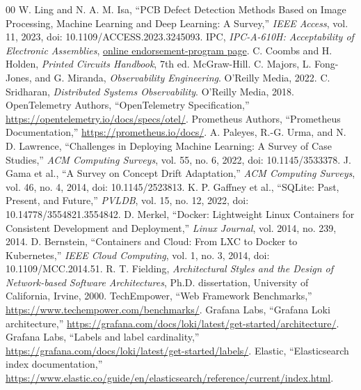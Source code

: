 \documentclass[12pt,a4paper]{article}
\begin{document}
\begin{thebibliography}{00}
 W. Ling and N. A. M. Isa, ``PCB Defect Detection Methods Based on Image Processing, Machine Learning and Deep Learning: A Survey,'' \textit{IEEE Access}, vol. 11, 2023, doi: 10.1109/ACCESS.2023.3245093.
 IPC, \textit{IPC-A-610H: Acceptability of Electronic Assemblies}, \href{https://www.electronics.org/ipc-610-acceptability-electronics-assemblies-endorsement-program}{online endorsement-program page}.
 C. Coombs and H. Holden, \textit{Printed Circuits Handbook}, 7th ed. McGraw-Hill. %
 C. Majors, L. Fong-Jones, and G. Miranda, \textit{Observability Engineering}. O'Reilly Media, 2022.
 C. Sridharan, \textit{Distributed Systems Observability}. O'Reilly Media, 2018.
 OpenTelemetry Authors, ``OpenTelemetry Specification,'' \url{https://opentelemetry.io/docs/specs/otel/}.
 Prometheus Authors, ``Prometheus Documentation,'' \url{https://prometheus.io/docs/}.
 A. Paleyes, R.-G. Urma, and N. D. Lawrence, ``Challenges in Deploying Machine Learning: A Survey of Case Studies,'' \textit{ACM Computing Surveys}, vol. 55, no. 6, 2022, doi: 10.1145/3533378.
 J. Gama et al., ``A Survey on Concept Drift Adaptation,'' \textit{ACM Computing Surveys}, vol. 46, no. 4, 2014, doi: 10.1145/2523813.
 K. P. Gaffney et al., ``SQLite: Past, Present, and Future,'' \textit{PVLDB}, vol. 15, no. 12, 2022, doi: 10.14778/3554821.3554842.
 D. Merkel, ``Docker: Lightweight Linux Containers for Consistent Development and Deployment,'' \textit{Linux Journal}, vol. 2014, no. 239, 2014.
 D. Bernstein, ``Containers and Cloud: From LXC to Docker to Kubernetes,'' \textit{IEEE Cloud Computing}, vol. 1, no. 3, 2014, doi: 10.1109/MCC.2014.51.
 R. T. Fielding, \textit{Architectural Styles and the Design of Network-based Software Architectures}, Ph.D. dissertation, University of California, Irvine, 2000.
 TechEmpower, ``Web Framework Benchmarks,'' \url{https://www.techempower.com/benchmarks/}.
 Grafana Labs, ``Grafana Loki architecture,'' \url{https://grafana.com/docs/loki/latest/get-started/architecture/}.
 Grafana Labs, ``Labels and label cardinality,'' \url{https://grafana.com/docs/loki/latest/get-started/labels/}.
 Elastic, ``Elasticsearch index documentation,'' \url{https://www.elastic.co/guide/en/elasticsearch/reference/current/index.html}.

\end{thebibliography}
\end{document}
